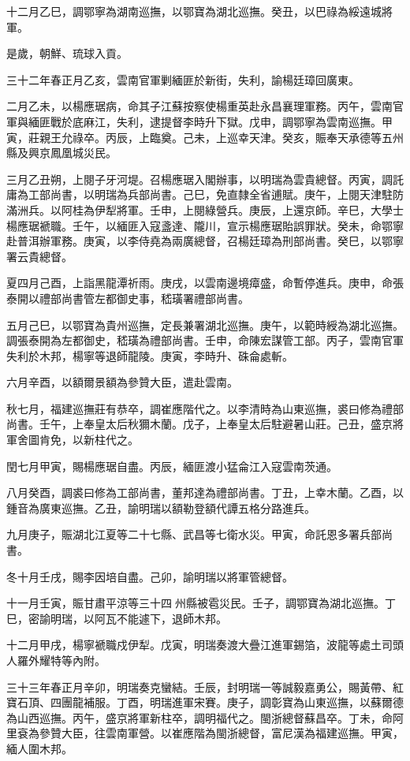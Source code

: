 \begin{pinyinscope}
十二月乙巳，調鄂寧為湖南巡撫，以鄂寶為湖北巡撫。癸丑，以巴祿為綏遠城將軍。

是歲，朝鮮、琉球入貢。

三十二年春正月乙亥，雲南官軍剿緬匪於新街，失利，諭楊廷璋回廣東。

二月乙未，以楊應琚病，命其子江蘇按察使楊重英赴永昌襄理軍務。丙午，雲南官軍與緬匪戰於底麻江，失利，逮提督李時升下獄。戊申，調鄂寧為雲南巡撫。甲寅，莊親王允祿卒。丙辰，上臨奠。己未，上巡幸天津。癸亥，賑奉天承德等五州縣及興京鳳凰城災民。

三月乙丑朔，上閱子牙河堤。召楊應琚入閣辦事，以明瑞為雲貴總督。丙寅，調託庸為工部尚書，以明瑞為兵部尚書。己巳，免直隸全省逋賦。庚午，上閱天津駐防滿洲兵。以阿桂為伊犁將軍。壬申，上閱綠營兵。庚辰，上還京師。辛巳，大學士楊應琚褫職。壬午，以緬匪入寇盞達、隴川，宣示楊應琚貽誤罪狀。癸未，命鄂寧赴普洱辦軍務。庚寅，以李侍堯為兩廣總督，召楊廷璋為刑部尚書。癸巳，以鄂寧署云貴總督。

夏四月己酉，上詣黑龍潭祈雨。庚戌，以雲南邊境瘴盛，命暫停進兵。庚申，命張泰開以禮部尚書管左都御史事，嵇璜署禮部尚書。

五月己巳，以鄂寶為貴州巡撫，定長兼署湖北巡撫。庚午，以範時綬為湖北巡撫。調張泰開為左都御史，嵇璜為禮部尚書。壬申，命陳宏謀管工部。丙子，雲南官軍失利於木邦，楊寧等退師龍陵。庚寅，李時升、硃侖處斬。

六月辛酉，以額爾景額為參贊大臣，遣赴雲南。

秋七月，福建巡撫莊有恭卒，調崔應階代之。以李清時為山東巡撫，裘曰修為禮部尚書。壬午，上奉皇太后秋獮木蘭。戊子，上奉皇太后駐避暑山莊。己丑，盛京將軍舍圖肯免，以新柱代之。

閏七月甲寅，賜楊應琚自盡。丙辰，緬匪渡小猛侖江入寇雲南茨通。

八月癸酉，調裘曰修為工部尚書，董邦達為禮部尚書。丁丑，上幸木蘭。乙酉，以鍾音為廣東巡撫。乙丑，諭明瑞以額勒登額代譚五格分路進兵。

九月庚子，賑湖北江夏等二十七縣、武昌等七衛水災。甲寅，命託恩多署兵部尚書。

冬十月壬戌，賜李因培自盡。己卯，諭明瑞以將軍管總督。

十一月壬寅，賑甘肅平涼等三十四州縣被雹災民。壬子，調鄂寶為湖北巡撫。丁巳，密諭明瑞，以阿瓦不能遽下，退師木邦。

十二月甲戌，楊寧褫職戍伊犁。戊寅，明瑞奏渡大疊江進軍錫箔，波龍等處土司頭人羅外耀特等內附。

三十三年春正月辛卯，明瑞奏克蠻結。壬辰，封明瑞一等誠毅嘉勇公，賜黃帶、紅寶石頂、四團龍補服。丁酉，明瑞進軍宋賽。庚子，調彰寶為山東巡撫，以蘇爾德為山西巡撫。丙午，盛京將軍新柱卒，調明福代之。閩浙總督蘇昌卒。丁未，命阿里袞為參贊大臣，往雲南軍營。以崔應階為閩浙總督，富尼漢為福建巡撫。甲寅，緬人圍木邦。


\end{pinyinscope}
